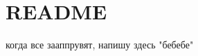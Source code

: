 \chapter{README}
\hypertarget{md__r_e_a_d_m_e}{}\label{md__r_e_a_d_m_e}
когда все зааппрувят, напишу здесь "{}бебебе"{} 